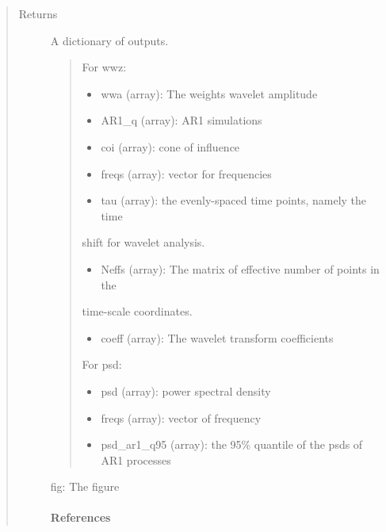\documentclass[letterpaper,10pt,english]{sphinxmanual}
\begin{document}
\begin{fulllineitems}
\begin{quote}
\begin{description}
\begin{itemize}
\end{itemize}

\item[{Returns}] \leavevmode

A dictionary of outputs.
\begin{quote}

For wwz:
\begin{itemize}
\item {} 
wwa (array): The weights wavelet amplitude

\item {} 
AR1\_q (array): AR1 simulations

\item {} 
coi (array): cone of influence

\item {} 
freqs (array): vector for frequencies

\item {} 
tau (array): the evenly-spaced time points, namely the time

\end{itemize}

shift for wavelet analysis.
\begin{itemize}
\item {} 
Neffs (array): The matrix of effective number of points in the

\end{itemize}

time-scale coordinates.
\begin{itemize}
\item {} 
coeff (array): The wavelet transform coefficients

\end{itemize}

For psd:
\begin{itemize}
\item {} 
psd (array): power spectral density

\item {} 
freqs (array): vector of frequency

\item {} 
psd\_ar1\_q95 (array): the 95\% quantile of the psds of AR1 processes

\end{itemize}
\end{quote}

fig: The figure
\paragraph{References}


\end{description}
\end{quote}
\end{fulllineitems}
\end{document}

